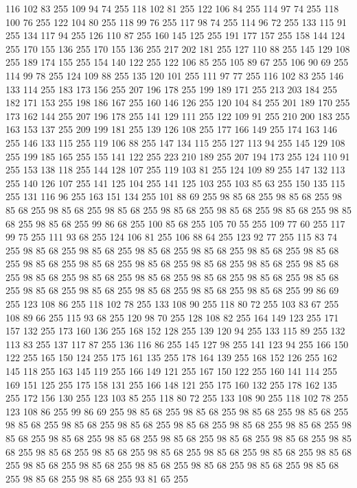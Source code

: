 116 102 83 255 109 94 74 255 118 102 81 255 122 106 84 255 114 97 74 255 118 100 76 255 122 104 80 255 118 99 76 255 117 98 74 255 114 96 72 255 133 115 91 255 134 117 94 255 126 110 87 255 160 145 125 255 191 177 157 255 158 144 124 255 170 155 136 255 170 155 136 255 217 202 181 255 127 110 88 255 145 129 108 255 189 174 155 255 154 140 122 255 122 106 85 255 105 89 67 255 106 90 69 255 114 99 78 255 124 109 88 255 135 120 101 255 111 97 77 255 116 102 83 255 146 133 114 255 183 173 156 255 207 196 178 255 199 189 171 255 213 203 184 255 182 171 153 255 198 186 167 255 160 146 126 255 120 104 84 255 201 189 170 255 173 162 144 255 207 196 178 255 141 129 111 255 122 109 91 255 210 200 183 255 163 153 137 255 209 199 181 255 139 126 108 255 177 166 149 255 174 163 146 255 146 133 115 255 119 106 88 255 147 134 115 255 127 113 94 255 145 129 108 255 199 185 165 255 155 141 122 255 223 210 189 255 207 194 173 255 124 110 91 255 153 138 118 255 144 128 107 255 119 103 81 255
124 109 89 255 147 132 113 255 140 126 107 255 141 125 104 255 141 125 103 255 103 85 63 255 150 135 115 255 131 116 96 255 163 151 134 255 101 88 69 255 98 85 68 255 98 85 68 255 98 85 68 255 98 85 68 255 98 85 68 255 98 85 68 255 98 85 68 255 98 85 68 255 98 85 68 255 98 85 68 255 99 86 68 255 100 85 68 255 105 70 55 255 109 77 60 255 117 99 75 255 111 93 68 255 124 106 81 255 106 88 64 255 123 92 77 255 115 83 74 255 98 85 68 255 98 85 68 255 98 85 68 255 98 85 68 255 98 85 68 255 98 85 68 255 98 85 68 255 98 85 68 255 98 85 68 255 98 85 68 255 98 85 68 255 98 85 68 255 98 85 68 255 98 85 68 255 98 85 68 255 98 85 68 255 98 85 68 255 98 85 68 255 98 85 68 255 98 85 68 255 98 85 68 255 98 85 68 255 98 85 68 255 99 86 69 255 123 108 86 255 118 102 78 255 133 108 90 255 118 80 72 255 103 83 67 255 108 89 66 255 115 93 68 255 120 98 70 255 128 108 82 255 164 149 123 255
171 157 132 255 173 160 136 255 168 152 128 255 139 120 94 255 133 115 89 255 132 113 83 255 137 117 87 255 136 116 86 255 145 127 98 255 141 123 94 255 166 150 122 255 165 150 124 255 175 161 135 255 178 164 139 255 168 152 126 255 162 145 118 255 163 145 119 255 166 149 121 255 167 150 122 255 160 141 114 255 169 151 125 255 175 158 131 255 166 148 121 255 175 160 132 255 178 162 135 255 172 156 130 255 123 103 85 255 118 80 72 255 133 108 90 255 118 102 78 255 123 108 86 255 99 86 69 255 98 85 68 255 98 85 68 255 98 85 68 255 98 85 68 255 98 85 68 255 98 85 68 255 98 85 68 255 98 85 68 255 98 85 68 255 98 85 68 255 98 85 68 255 98 85 68 255 98 85 68 255 98 85 68 255 98 85 68 255 98 85 68 255 98 85 68 255 98 85 68 255 98 85 68 255 98 85 68 255 98 85 68 255 98 85 68 255 98 85 68 255 98 85 68 255 98 85 68 255 98 85 68 255 98 85 68 255 98 85 68 255 98 85 68 255 98 85 68 255 98 85 68 255 93 81 65 255
